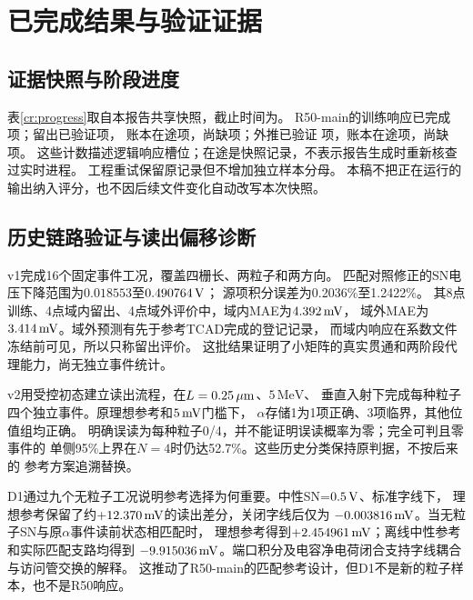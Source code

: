 \section{已完成结果与验证证据}
\label{cr:results}
\subsection{证据快照与阶段进度}
表\ref{cr:progress}取自本报告共享快照，截止时间为\EvidenceDate。
R50-main的训练响应已完成\TrainVerified{}项；留出已验证\HoldoutVerified{}项，
账本在途\HoldoutRunning{}项，尚缺\HoldoutMissing{}项；外推已验证
\ExtrapVerified{}项，账本在途\ExtrapRunning{}项，尚缺\ExtrapMissing{}项。
这些计数描述逻辑响应槽位；在途是快照记录，不表示报告生成时重新核查过实时进程。
工程重试保留原记录但不增加独立样本分母。
本稿不把正在运行的输出纳入评分，也不因后续文件变化自动改写本次快照。

\begin{table}[htbp]
\centering\small
\caption{R50-main在共享证据快照时的完成状态。训练与测试预测已冻结，
未完成的求解及后续验证均按真实状态列出。}
\label{cr:progress}

\end{table}

\subsection{历史链路验证与读出偏移诊断}
v1完成16个固定事件工况，覆盖四栅长、两粒子和两方向。
匹配对照修正的SN电压下降范围为$0.018553$至$0.490764\,\mathrm{V}$；
源项积分误差为0.2036\%至1.2422\%。
其8点训练、4点域内留出、4点域外评价中，域内MAE为$4.392\,\mathrm{mV}$，
域外MAE为$3.414\,\mathrm{mV}$。域外预测有先于参考TCAD完成的登记记录，
而域内响应在系数文件冻结前可见，所以只称留出评价。
这批结果证明了小矩阵的真实贯通和两阶段代理能力，尚无独立事件统计。

v2用受控初态建立读出流程，在$L=0.25\,\mu\mathrm{m}$、$5\,\mathrm{MeV}$、
垂直入射下完成每种粒子四个独立事件。原理想参考和$5\,\mathrm{mV}$门槛下，
$\alpha$存储1为1项正确、3项临界，其他位值组均正确。
明确误读为每种粒子0/4，并不能证明误读概率为零；完全可判且零事件的
单侧95\%上界在$N=4$时仍达52.7\%。这些历史分类保持原判据，不按后来的
参考方案追溯替换。

D1通过九个无粒子工况说明参考选择为何重要。中性SN=$0.5\,\mathrm{V}$、标准字线下，
理想参考保留了约$+12.370\,\mathrm{mV}$的读出差分，关闭字线后仅为
$-0.003816\,\mathrm{mV}$。当无粒子SN与原$\alpha$事件读前状态相匹配时，
理想参考得到$+2.454961\,\mathrm{mV}$；离线中性参考和实际匹配支路均得到
$-9.915036\,\mathrm{mV}$。端口积分及电容净电荷闭合支持字线耦合与访问管交换的解释。
这推动了R50-main的匹配参考设计，但D1不是新的粒子样本，也不是R50响应。

